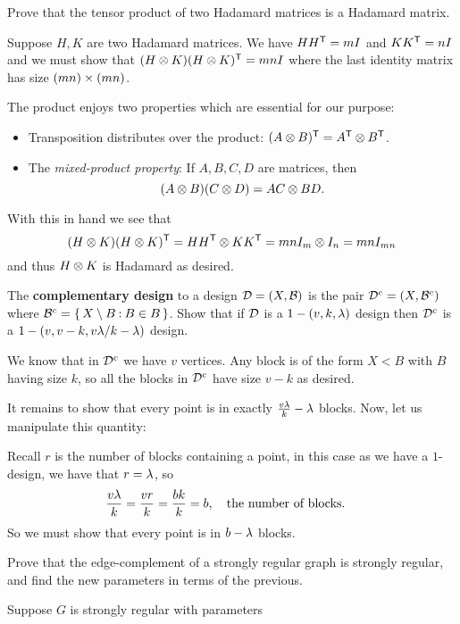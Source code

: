 \documentclass[12pt]{memoir}
\begin{document}
\begin{Ej}[Exercise 1]
    Prove that the tensor product of two Hadamard matrices is a Hadamard matrix.
\end{Ej}

\begin{ptcbr}
Suppose $H,K$ are two Hadamard matrices. We have $HH^{\mathsf{T}}=mI$ and $KK^{\mathsf{T}}=nI$ and we must show that $(H\otimes K)(H\otimes K)^{\mathsf{T}}=mnI$ where the last identity matrix has size $(mn)\times(mn)$.\par 
The product enjoys two properties which are essential for our purpose:
\begin{itemize}
    \item Transposition distributes over the product: $(A\otimes B)^{\mathsf{T}}=A^{\mathsf{T}}\otimes B^{\mathsf{T}}$.
    \item The \emph{mixed-product property}: If $A,B,C,D$ are matrices, then 
    $$(A\otimes B)(C\otimes D)=AC\otimes BD.$$
\end{itemize}
With this in hand we see that
$$(H\otimes K)(H\otimes K)^{\mathsf{T}}=HH^{\mathsf{T}}\otimes KK^{\mathsf{T}}=mn I_m\otimes I_n=mn I_{mn}$$
and thus $H\otimes K$ is Hadamard as desired.
\end{ptcbr}

\begin{Ej}[Exercise 4]
    The \textbf{complementary design} to a design $\mathcal{D} = (X, \mathcal{B})$ is the pair $\mathcal{D}^c = (X, \mathcal{B}^c)$ where $\mathcal{B}^c = \{\,X \setminus B \mathbin{:} B \in B\,\}$. Show that if $\mathcal{D}$ is a $1 - (v, k, \lambda)$ design then $\mathcal{D}^c$ is a $1 - (v, v - k, v\lambda/k-\lambda)$ design.
\end{Ej}
\begin{ptcbr}
We know that in $\mathcal{D}^c$ we have $v$ vertices. Any block is of the form $X\less B$ with $B$ having size $k$, so all the blocks in $\mathcal{D}^c$ have size $v-k$ as desired.\par 
It remains to show that every point is in exactly $\frac{v\lambda}{k}-\lambda$ blocks. Now, let us manipulate this quantity:\par 
Recall $r$ is the number of blocks containing a point, in this case as we have a $1$-design, we have that $r=\lambda$, so 
$$\frac{v\lambda}{k}=\frac{vr}{k}=\frac{bk}{k}=b,\quad\text{the number of blocks.}\quad$$
So we must show that every point is in $b-\lambda$ blocks. 
\end{ptcbr}

\begin{Ej}[Exercise 6]
    Prove that the edge-complement of a strongly regular graph is strongly regular, and find the new parameters in terms of the previous.
\end{Ej}

\begin{ptcbr}
    Suppose $G$ is strongly regular with parameters 
\end{ptcbr}
\end{document}
